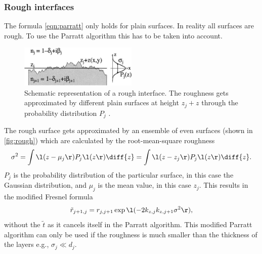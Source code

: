 \subsubsection{Rough interfaces}
The formula \eqref{eqn:parratt} only holds for plain surfaces.
In reality all surfaces are rough.
To use the Parratt algorithm this has to be taken into account.
\begin{figure}
    \centering
    \includegraphics[width=0.5\textwidth]{images/rough.png}
    \caption{Schematic representation of a rough interface.
    The roughness gets approximated by different plain surfaces at height $z_j+z$ through the probability distribution $P_j$ \cite[15]{V44:xrr_tolan}.}
    \label{fig:rough}
\end{figure}
The rough surface gets approximated by an ensemble of even surfaces (shown in \autoref{fig:rough}) which are calculated by the root-mean-square roughness
\begin{equation*}
    \sigma^2 = \int \l(z-\mu_j\r) P_j\l(z\r) \diff{z} = \int \l(z-z_j\r) P_j\l(z\r) \diff{z}. \\
\end{equation*}
$P_j$ is the probability distribution of the particular surface, in this case the Gaussian distribution, and $\mu_j$ is the mean value, in this case $z_j$.
This results in the modified Fresnel formula
\begin{equation}
    \tilde{r}_{j+1,j} = r_{j,j+1}\exp\l(-2k_{z,j}k_{z,j+1}\sigma^2\r),
\end{equation}
without the $\tilde{t}$ as it cancels itself in the Parratt algorithm.
This modified Parratt algorithm can only be used if the roughness is much smaller than the thickness of the layers e.g., $\sigma_j\ll d_j$.

